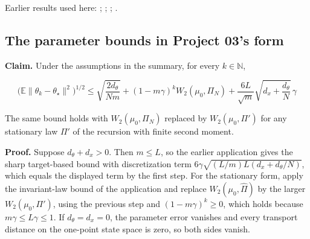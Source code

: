 \documentclass[11pt,a4paper]{report}
\begin{document}
Earlier results used here: \cite[Section~3.17.4]{LangevinLean2026ULASC}; \cite[Section~3.21.2]{LangevinLean2026ULASC}; \cite[Section~3.36.7]{LangevinLean2026ULASC}; \cite[Section~3.1.1]{LangevinLean2026IPLA}.
\subsection{\texorpdfstring{The parameter bounds in Project 03's form}{The parameter bounds in Project 03's form}}
\label{report-step-WassersteinMixing-IPLATheorem-lean-4}


\textbf{Claim.} Under the assumptions in the summary, for every \(k\in\mathbb N\),

\[\bigl(\mathbb E\|\theta_k-\theta_\star\|^2\bigr)^{1/2}\le\sqrt{\frac{2d_\theta}{Nm}}+(1-m\gamma)^kW_2(\mu_0,\Pi_N)+\frac{6L}{\sqrt m}\sqrt{d_x+\frac{d_\theta}N}\,\gamma\]

The same bound holds with \(W_2(\mu_0,\Pi_N)\) replaced by \(W_2(\mu_0,\Pi')\) for any stationary law \(\Pi'\) of the recursion with finite second moment.



\textbf{Proof.} Suppose \(d_\theta+d_x>0\). Then \(m\le L\), so the earlier application gives the sharp target-based bound with discretization term \(6\gamma\sqrt{(L/m)L(d_x+d_\theta/N)}\), which equals the displayed term by the first step. For the stationary form, apply the invariant-law bound of the application and replace \(W_2(\mu_0,\widehat\Pi)\) by the larger \(W_2(\mu_0,\Pi')\), using the previous step and \((1-m\gamma)^k\ge0\), which holds because \(m\gamma\le L\gamma\le1\). If \(d_\theta=d_x=0\), the parameter error vanishes and every transport distance on the one-point state space is zero, so both sides vanish.
\end{document}
